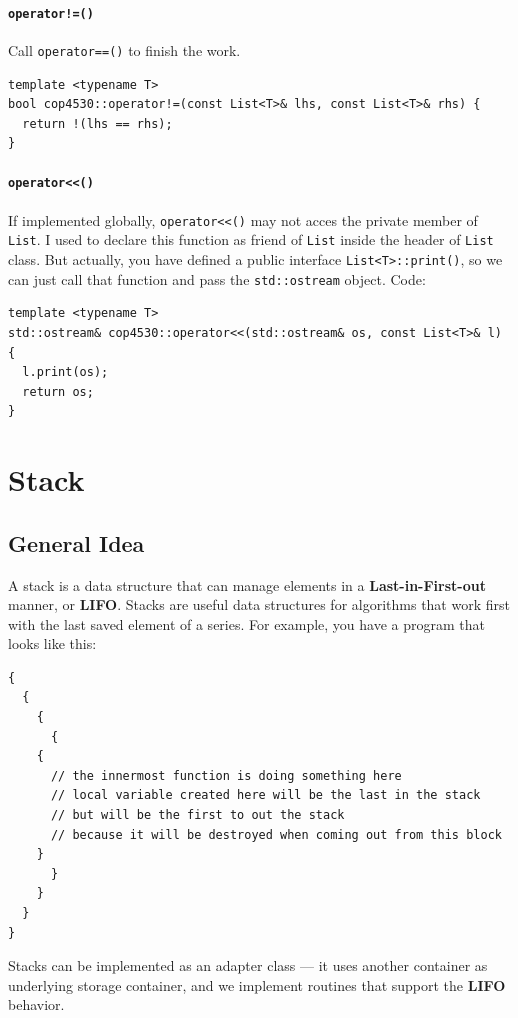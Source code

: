 \documentclass[12pt]{book}
\begin{document}
\subsubsection{\texttt{operator!=()}}
\label{sec:org581f4e7}
Call \texttt{operator==()} to finish the work.
\begin{verbatim}
template <typename T>
bool cop4530::operator!=(const List<T>& lhs, const List<T>& rhs) {
  return !(lhs == rhs);
}
\end{verbatim}
\subsubsection{\texttt{operator<<()}}
\label{sec:org0d13592}
If implemented globally, \texttt{operator<<()} may not acces the private member of \texttt{List}. I used to declare this function as friend of \texttt{List} inside the header of \texttt{List} class. But actually, you have defined a public interface \texttt{List<T>::print()}, so we can just call that function and pass the \texttt{std::ostream} object. Code:
\begin{verbatim}
template <typename T>
std::ostream& cop4530::operator<<(std::ostream& os, const List<T>& l) {
  l.print(os);
  return os;
}
\end{verbatim}
\chapter{Stack}
\label{sec:org1c98855}
\section{General Idea}
\label{sec:org4d1d85b}
A stack is a data structure that can manage elements in a \textbf{Last-in-First-out} manner, or \textbf{LIFO}. Stacks are useful data structures for algorithms that work first with the last saved element of a series. For example, you have a program that looks like this:
\begin{verbatim}
{
  {
    {
      {
	{
	  // the innermost function is doing something here
	  // local variable created here will be the last in the stack
	  // but will be the first to out the stack
	  // because it will be destroyed when coming out from this block
	}
      }
    }
  }
}
\end{verbatim}

Stacks can be implemented as an adapter class --- it uses another container as underlying storage container, and we implement routines that support the \textbf{LIFO} behavior.
\end{document}
